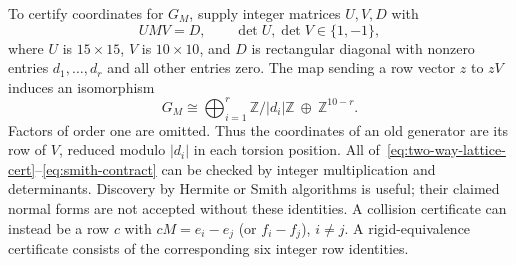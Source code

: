 \documentclass[11pt]{article}
\theoremstyle{remark}
\newcommand{\Z}{\mathbb Z}
\begin{document}
To certify coordinates for $G_M$, supply integer matrices $U,V,D$ with
\begin{equation}\label{eq:smith-contract}
 UMV=D,\qquad \det U,\det V\in\{1,-1\},
\end{equation}
where $U$ is $15\times15$, $V$ is $10\times10$, and $D$ is rectangular
diagonal with nonzero entries $d_1,\ldots,d_r$ and all other entries zero.
The map sending a row vector $z$ to $zV$ induces an isomorphism
\[
 G_M\cong\bigoplus_{i=1}^{r}\Z/|d_i|\Z\ \oplus\ \Z^{10-r}.
\]
Factors of order one are omitted. Thus the coordinates of an old generator
are its row of $V$, reduced modulo $|d_i|$ in each torsion position. All
of~\eqref{eq:two-way-lattice-cert}--\eqref{eq:smith-contract} can be
checked by integer multiplication and determinants. Discovery by Hermite
or Smith algorithms is useful; their claimed normal forms are not accepted
without these identities. A collision certificate can instead be a row
$c$ with $cM=e_i-e_j$ (or $f_i-f_j$), $i\ne j$. A rigid-equivalence
certificate consists of the corresponding six integer row identities.
\end{document}
